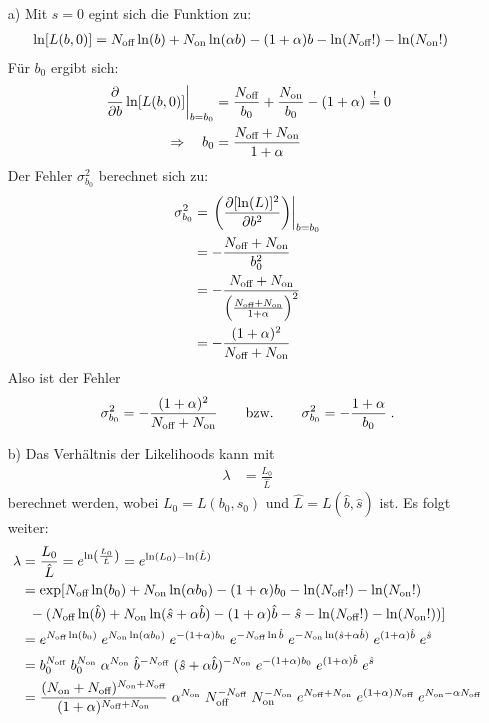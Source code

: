 \begin{itemize}
	\item[a)]
	Mit $s=0$ egint sich die Funktion zu:
	\begin{align*}
		\ln[L(b,0)] &= N_{\text{off}} \ln(b) + N_{\text{on}} \ln(\alpha b) - (1+\alpha)b - \ln(N_{\text{off}}!) - \ln(N_{\text{on}}!)
	\end{align*}
	Für $b_0$ ergibt sich:
	\begin{align*}
		\left. \frac{\partial}{\partial b}\ln[L(b,0)]\right|_{b=b_0} &= \frac{N_{\text{off}}}{b_0} + \frac{N_{\text{on}}}{b_0} - (1+\alpha) \overset{!}{=} 0	\\
			\Rightarrow \quad b_0 &= \frac{N_{\text{off}} + N_{\text{on}}}{1+\alpha}
	\end{align*}
	Der Fehler $\sigma_{b_0}^2$ berechnet sich zu:
	\begin{align*}
		\sigma_{b_0}^2 &= \left. \left(\frac{\partial [\ln(L)]^2}{\partial b^2}\right) \right|_{b=b_0} 	\\
			&= -\frac{N_{\text{off}} + N_{\text{on}}}{b_0^2}	\\
			&= -\frac{N_{\text{off}} + N_{\text{on}}}{\left(\frac{N_{\text{off}} + N_{\text{on}}}{1+\alpha}\right)^2}	\\
			&= -\frac{(1+\alpha)^2}{N_{\text{off}}+N_{\text{on}}}
	\end{align*}
	Also ist der Fehler
	\begin{align*}
		\sigma_{b_0}^2 = -\frac{(1+\alpha)^2}{N_{\text{off}}+N_{\text{on}}} \qquad \text{bzw.} \qquad \sigma_{b_0}^2 = -\frac{1+\alpha}{b_0}\;.
	\end{align*}
	
	\newpage
	\item[b)]
	Das Verhältnis der Likelihoods kann mit
	\begin{align*}
		\lambda	&= \frac{L_0}{\hat{L}} 
	\end{align*}
	berechnet werden, wobei $L_0 = L(b_0, s_0)$ und $\hat{L} = L(\hat{b}, \hat{s})$ ist. Es folgt weiter:
	\begin{align*}
		\lambda &= \frac{L_0}{\hat{L}} = e^{\ln\left(\frac{L_0}{\hat{L}}\right)} = e^{\ln(L_0) - \ln(\hat{L})}	\\
			&= \exp[N_{\text{off}} \ln(b_0) + N_{\text{on}} \ln(\alpha b_0) - (1+\alpha)b_0 - \ln(N_{\text{off}}!) - \ln(N_{\text{on}}!)	\\
				& \;\;-(N_{\text{off}} \ln(\hat{b}) + N_{\text{on}} \ln(\hat{s}+\alpha\hat{b}) - (1+\alpha)\hat{b} - \hat{s} - \ln(N_{\text{off}}!) - \ln(N_{\text{on}}!) )]	\\
			&= e^{N_{\text{off}} \ln(b_0)}\; e^{N_{\text{on}} \ln(\alpha b_0)}\; e^{-(1+\alpha)b_0}\; e^{-N_{\text{off}} \ln{\hat{b}}}\; e^{-N_{\text{on}} \ln(\hat{s}+ \alpha\hat{b})}\; e^{(1+\alpha)\hat{b}}\; e^{\hat{s}}	\\
			&= b_0^{N_{\text{off}}}\; b_0^{N_{\text{on}}}\; \alpha^{N_{\text{on}}}\; \hat{b}^{-N_{\text{off}}}\; (\hat{s}+\alpha\hat{b})^{-N_{\text{on}}}\; e^{-(1+\alpha)b_0}\; e^{(1+\alpha)\hat{b}} \; e^{\hat{s}}	\\
			&= \frac{(N_{\text{on}}+N_{\text{off}})^{N_{\text{on}}+N_{\text{off}}}}{(1+\alpha)^{N_{\text{off}}+N_{\text{on}}}}\; \alpha^{N_{\text{on}}}\; N_{\text{off}}^{-N_{\text{off}}}\; N_{\text{on}}^{-N_{\text{on}}}\; e^{N_{\text{off}} + N_{\text{on}}}\; e^{(1+\alpha)N_{\text{off}}}\; e^{N_{\text{on}} - \alpha{N_{\text{off}}}}
	\end{align*}
	

\end{itemize}

